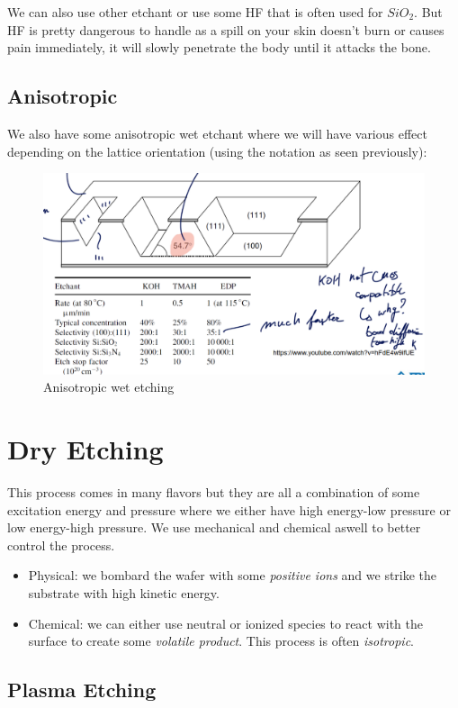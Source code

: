 \documentclass{report}
\begin{document}
We can also use other etchant or use some HF that is often used for $SiO_2$. But HF is pretty dangerous to handle as a spill on your skin doesn't burn or causes pain immediately, it will slowly penetrate the body until it attacks the bone.

\subsection{Anisotropic}

We also have some anisotropic wet etchant where we will have various effect depending on the lattice orientation (using the notation as seen previously):

\begin{figure}[H]
    \centering
    \includegraphics[width=0.75\linewidth]{ansitropic_wet.png}
    \caption{Anisotropic wet etching}
    \label{fig:enter-label}
\end{figure}

\section{Dry Etching}

This process comes in many flavors but they are all a combination of some excitation energy and pressure where we either have high energy-low pressure or low energy-high pressure. We use mechanical and chemical aswell to better control the process.

\begin{itemize}
    \item Physical: we bombard the wafer with some \textit{positive ions} and we strike the substrate with high kinetic energy.
    \item Chemical: we can either use neutral or ionized species to react with the surface to create some \textit{volatile product}. This process is often \textit{isotropic}.
\end{itemize}

\subsection{Plasma Etching}
\end{document}
